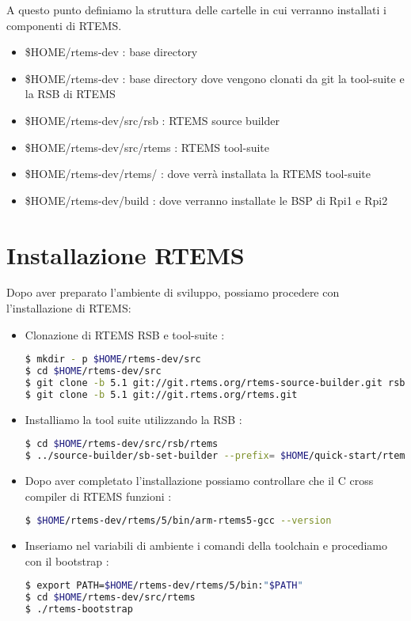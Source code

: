 \documentclass[10pt, a4paper]{article}
\begin{document}
\begin{flushleft}
A questo punto definiamo la struttura delle cartelle in cui verranno installati i componenti di RTEMS.

\begin{itemize}
\item \$HOME/rtems-dev  : base directory
\item \$HOME/rtems-dev : base directory dove vengono clonati da git la tool-suite e la RSB di RTEMS
\item \$HOME/rtems-dev/src/rsb : RTEMS source builder
\item \$HOME/rtems-dev/src/rtems : RTEMS tool-suite
\item \$HOME/rtems-dev/rtems/ : dove verrà installata la RTEMS tool-suite
\item \$HOME/rtems-dev/build : dove verranno installate le BSP di Rpi1 e Rpi2
\end{itemize}
\newpage
\section{Installazione RTEMS}

Dopo aver preparato l'ambiente di sviluppo, possiamo procedere con l'installazione di RTEMS:
\begin{itemize}

\item Clonazione di RTEMS RSB e tool-suite : 
\begin{lstlisting}[language=bash] 
$ mkdir - p $HOME/rtems-dev/src
$ cd $HOME/rtems-dev/src
$ git clone -b 5.1 git://git.rtems.org/rtems-source-builder.git rsb
$ git clone -b 5.1 git://git.rtems.org/rtems.git
\end{lstlisting}

\item Installiamo la tool suite utilizzando la RSB :
\begin{lstlisting}[language=bash] 
$ cd $HOME/rtems-dev/src/rsb/rtems
$ ../source-builder/sb-set-builder --prefix= $HOME/quick-start/rtems/5 5/rtems-arm
\end{lstlisting}

\item Dopo aver completato l'installazione possiamo controllare che il C cross compiler di RTEMS funzioni : 
\begin{lstlisting}[language=bash] 
$ $HOME/rtems-dev/rtems/5/bin/arm-rtems5-gcc --version
\end{lstlisting}	

\item Inseriamo nel variabili di  ambiente i comandi della toolchain e procediamo con il bootstrap : 
\begin{lstlisting}[language=bash] 
$ export PATH=$HOME/rtems-dev/rtems/5/bin:"$PATH"
$ cd $HOME/rtems-dev/src/rtems
$ ./rtems-bootstrap
\end{lstlisting}	
	

\end{itemize}
\end{flushleft}
\end{document}

